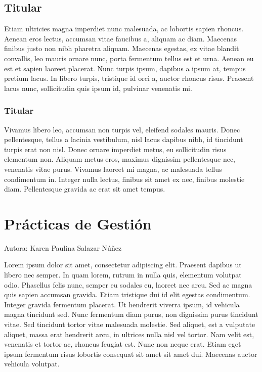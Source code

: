 \documentclass[
  letterpaper,
  DIV=11,
  numbers=noendperiod]{scrreprt}
\begin{document}
\hypertarget{titular-2}{%
\section{Titular}\label{titular-2}}

Etiam ultricies magna imperdiet nunc malesuada, ac lobortis sapien
rhoncus. Aenean eros lectus, accumsan vitae faucibus a, aliquam ac diam.
Maecenas finibus justo non nibh pharetra aliquam. Maecenas egestas, ex
vitae blandit convallis, leo mauris ornare nunc, porta fermentum tellus
est et urna. Aenean eu est et sapien laoreet placerat. Nunc turpis
ipsum, dapibus a ipsum at, tempus pretium lacus. In libero turpis,
tristique id orci a, auctor rhoncus risus. Praesent lacus nunc,
sollicitudin quis ipsum id, pulvinar venenatis mi.

\hypertarget{titular-3}{%
\subsection{Titular}\label{titular-3}}

Vivamus libero leo, accumsan non turpis vel, eleifend sodales mauris.
Donec pellentesque, tellus a lacinia vestibulum, nisl lacus dapibus
nibh, id tincidunt turpis erat non nisl. Donec ornare imperdiet metus,
eu sollicitudin risus elementum non. Aliquam metus eros, maximus
dignissim pellentesque nec, venenatis vitae purus. Vivamus laoreet mi
magna, ac malesuada tellus condimentum in. Integer nulla lectus, finibus
sit amet ex nec, finibus molestie diam. Pellentesque gravida ac erat sit
amet tempus.


\hypertarget{pruxe1cticas-de-gestiuxf3n}{%
\chapter{Prácticas de Gestión}\label{pruxe1cticas-de-gestiuxf3n}}

Autora: Karen Paulina Salazar Núñez

Lorem ipsum dolor sit amet, consectetur adipiscing elit. Praesent
dapibus ut libero nec semper. In quam lorem, rutrum in nulla quis,
elementum volutpat odio. Phasellus felis nunc, semper eu sodales eu,
laoreet nec arcu. Sed ac magna quis sapien accumsan gravida. Etiam
tristique dui id elit egestas condimentum. Integer gravida fermentum
placerat. Ut hendrerit viverra ipsum, id vehicula magna tincidunt sed.
Nunc fermentum diam purus, non dignissim purus tincidunt vitae. Sed
tincidunt tortor vitae malesuada molestie. Sed aliquet, est a vulputate
aliquet, massa erat hendrerit arcu, in ultrices nulla nisl vel tortor.
Nam velit est, venenatis et tortor ac, rhoncus feugiat est. Nunc non
neque erat. Etiam eget ipsum fermentum risus lobortis consequat sit amet
sit amet dui. Maecenas auctor vehicula volutpat.
\end{document}
